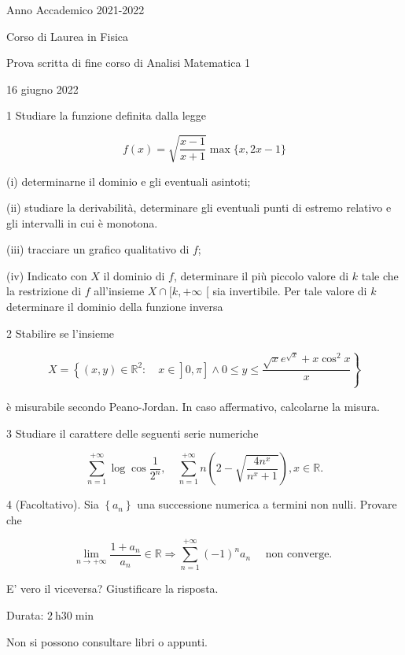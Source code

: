 \documentclass[10pt]{article}
\begin{document}
Anno Accademico 2021-2022

Corso di Laurea in Fisica

Prova scritta di fine corso di Analisi Matematica 1

16 giugno 2022

1 Studiare la funzione definita dalla legge

\[
f(x)=\sqrt{\frac{x-1}{x+1}} \max \{x, 2 x-1\}
\]

(i) determinarne il dominio e gli eventuali asintoti;

(ii) studiare la derivabilità, determinare gli eventuali punti di estremo relativo e gli intervalli in cui è monotona.

(iii) tracciare un grafico qualitativo di \(f\);

(iv) Indicato con \(X\) il dominio di \(f\), determinare il più piccolo valore di \(k\) tale che la restrizione di \(f\) all'insieme \(X \cap[k,+\infty\) [ sia invertibile. Per tale valore di \(k\) determinare il dominio della funzione inversa

2 Stabilire se l'insieme

\[
\left.\left.X=\left\{(x, y) \in \mathbb{R}^{2}: \quad x \in\right] 0, \pi\right] \wedge 0 \leq y \leq \frac{\sqrt{x} e^{\sqrt{x}}+x \cos ^{2} x}{x}\right\}
\]

è misurabile secondo Peano-Jordan. In caso affermativo, calcolarne la misura.

3 Studiare il carattere delle seguenti serie numeriche

\[
\sum_{n=1}^{+\infty} \log \cos \frac{1}{2^{n}}, \quad \sum_{n=1}^{+\infty} n\left(2-\sqrt{\frac{4 n^{x}}{n^{x}+1}}\right), x \in \mathbb{R} .
\]

4 (Facoltativo). Sia \(\left\{a_{n}\right\}\) una successione numerica a termini non nulli. Provare che

\[
\lim _{n \rightarrow+\infty} \frac{1+a_{n}}{a_{n}} \in \mathbb{R} \Longrightarrow \sum_{n=1}^{+\infty}(-1)^{n} a_{n} \quad \text { non converge. }
\]

E' vero il viceversa? Giustificare la risposta.

Durata: \(2 \mathrm{~h} 30 \min\)

Non si possono consultare libri o appunti.
\end{document}
